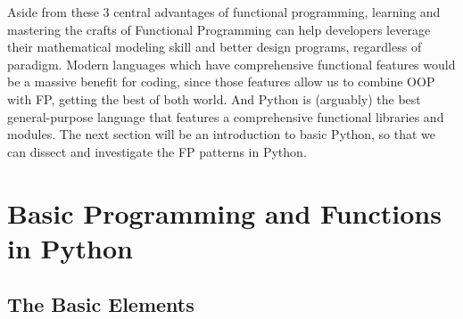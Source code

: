 \documentclass[twoside,final]{hcmut-report}
\begin{document}
\hspace*{1mm} Aside from these 3 central advantages of functional programming, learning and mastering the crafts of Functional Programming can help developers leverage their mathematical modeling skill and better design programs, regardless of paradigm. Modern languages which have comprehensive functional features would be a massive benefit for coding, since those features allow us to combine OOP with FP, getting the best of both world. And Python is (arguably) the best general-purpose language that features a comprehensive functional libraries and modules. The next section will be an introduction to basic Python, so that we can dissect and investigate the FP patterns in Python.

\section{Basic Programming and Functions in Python}
\subsection{The Basic Elements}
\end{document}
